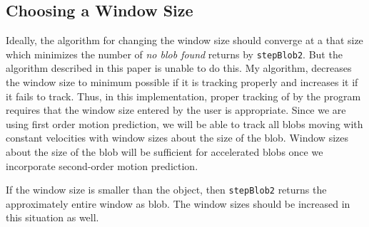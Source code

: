 \documentclass[12pt]{article}
\begin{document}
\subsection{Choosing a Window Size}
\par Ideally, the algorithm for changing the window size should converge at a that size which minimizes the number of {\it no blob found} returns by {\tt stepBlob2}. But the algorithm described in this paper is unable to do this. My algorithm, decreases the window size to minimum possible if it is tracking properly and increases it if it fails to track. Thus, in this implementation, proper tracking of by the program requires that the window size entered by the user is appropriate. Since we are using first order motion prediction, we will be able to track all blobs moving with constant velocities with window sizes about the size of the blob. Window sizes about the size of the blob will be sufficient for accelerated blobs once we incorporate second-order motion prediction.
\par If the window size is smaller than the object, then {\tt stepBlob2} returns the approximately entire window as blob. The window sizes should be increased in this situation as well.
\end{document}
